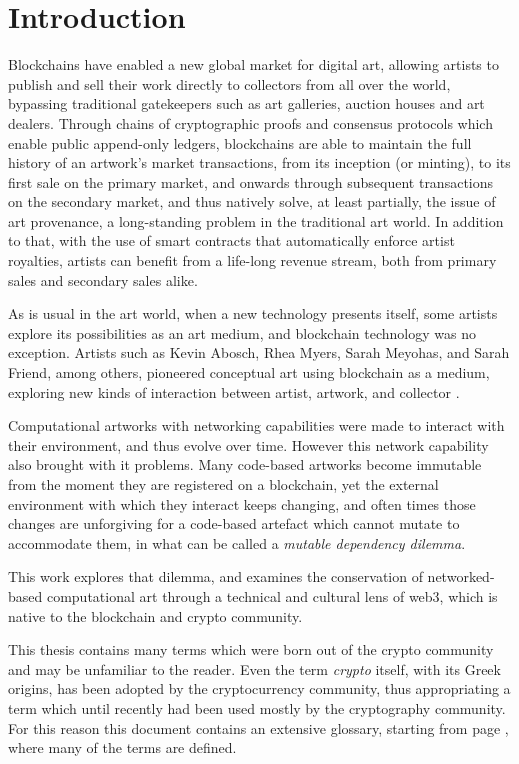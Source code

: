 \chapter{Introduction}

Blockchains have enabled a new global market for digital art, allowing artists to publish and sell their work directly to collectors from all over the world, bypassing traditional gatekeepers such as art galleries, auction houses and art dealers. Through chains of cryptographic proofs and consensus protocols which enable public append-only ledgers, blockchains are able to maintain the full history of an artwork's market transactions, from its inception (or \gls{minting}), to its first sale on the \gls{primary market}, and onwards through subsequent transactions on the \gls{secondary market}, and thus natively solve, at least partially, the issue of art provenance, a long-standing problem in the traditional art world. In addition to that, with the use of smart contracts that automatically enforce artist royalties, artists can benefit from a life-long revenue stream, both from \gls{primary sales} and \gls{secondary sales} alike.

As is usual in the art world, when a new technology presents itself, some artists explore its possibilities as an art medium, and blockchain technology was no exception. Artists such as Kevin Abosch, Rhea Myers, Sarah Meyohas, and Sarah Friend, among others, pioneered \gls{conceptual art} using blockchain as a medium, exploring new kinds of interaction between artist, artwork, and collector \cite{rcsBlockchainMedium2022}.

Computational artworks with networking capabilities were made to interact with their environment, and thus evolve over time. However this network capability also brought with it problems. Many code-based artworks become immutable from the moment they are registered on a blockchain, yet the external environment with which they interact keeps changing, and often times those changes are unforgiving for a code-based artefact which cannot mutate to accommodate them, in what can be called a \emph{mutable dependency dilemma}.

This work explores that dilemma, and examines the conservation of networked-based computational art through a technical and cultural lens of \gls{web3}, which is native to the blockchain and crypto community.

This thesis contains many terms which were born out of the crypto community and may be unfamiliar to the reader. Even the term \emph{crypto} itself, with its Greek origins, has been adopted by the cryptocurrency community, thus appropriating a term which until recently had been used mostly by the cryptography community. For this reason this document contains an extensive glossary, starting from page \pageref{sec:glossary}, where many of the terms are defined.

